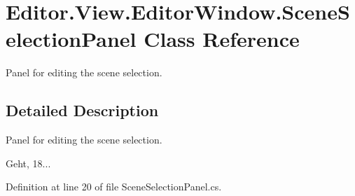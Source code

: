 \section{Editor.\-View.\-Editor\-Window.\-Scene\-Selection\-Panel Class Reference}
\label{class_editor_1_1_view_1_1_editor_window_1_1_scene_selection_panel}


Panel for editing the scene selection.  




\subsection{Detailed Description}
Panel for editing the scene selection. 

Geht, 18... 

Definition at line 20 of file Scene\-Selection\-Panel.\-cs.

